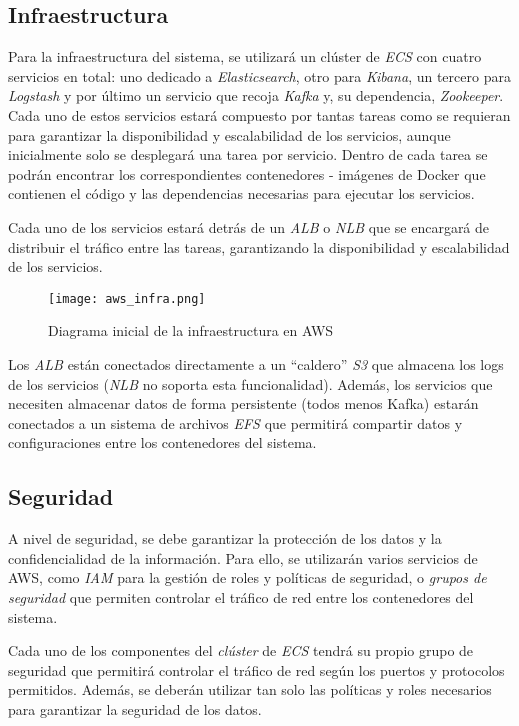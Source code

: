 \subsection{Infraestructura}
Para la infraestructura del sistema, se utilizará un clúster de \textit{ECS} con
cuatro servicios en total: uno dedicado a \textit{Elasticsearch}, otro para
\textit{Kibana}, un tercero para \textit{Logstash} y por último un servicio que
recoja \textit{Kafka} y, su dependencia, \textit{Zookeeper}. Cada uno de estos
servicios estará compuesto por tantas tareas como se requieran para garantizar
la disponibilidad y escalabilidad de los servicios, aunque inicialmente solo se
desplegará una tarea por servicio. Dentro de cada tarea se podrán encontrar los
correspondientes contenedores - imágenes de Docker que contienen el código y las
dependencias necesarias para ejecutar los servicios.

Cada uno de los servicios estará detrás de un \textit{ALB} o \textit{NLB} que se
encargará de distribuir el tráfico entre las tareas, garantizando la
disponibilidad y escalabilidad de los servicios.

\begin{figure}[H]
	\centerline{\texttt{[image: aws\_infra.png]}}
	\caption{Diagrama inicial de la infraestructura en AWS}
	\label{fig:aws_infra}
\end{figure}

Los \textit{ALB} están conectados directamente a un ``caldero'' \textit{S3} que
almacena los logs de los servicios (\textit{NLB} no soporta esta funcionalidad).
Además, los servicios que necesiten almacenar datos de forma persistente (todos
menos Kafka) estarán conectados a un sistema de archivos \textit{EFS} que
permitirá compartir datos y configuraciones entre los contenedores del sistema.


\subsection{Seguridad}
A nivel de seguridad, se debe garantizar la protección de los datos y la
confidencialidad de la información. Para ello, se utilizarán varios servicios de
AWS, como \textit{IAM} para la gestión de roles y políticas de seguridad, o
\textit{grupos de seguridad} que permiten controlar el tráfico de red entre los
contenedores del sistema.

Cada uno de los componentes del \textit{clúster} de \textit{ECS} tendrá su
propio grupo de seguridad que permitirá controlar el tráfico de red según los
puertos y protocolos permitidos. Además, se deberán utilizar tan solo las
políticas y roles necesarios para garantizar la seguridad de los datos.

